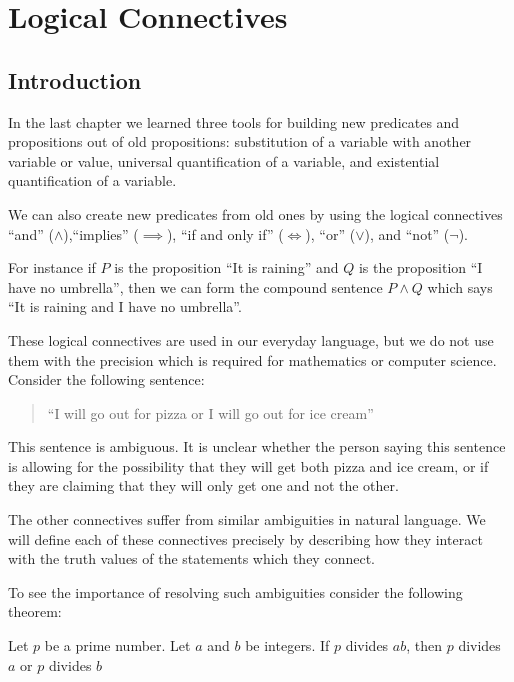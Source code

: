 \chapter{Logical Connectives}

\section{Introduction}

In the last chapter we learned three tools for building new predicates and propositions out of old propositions:  substitution of a variable with another variable or value, universal quantification of a variable, and existential quantification of a variable.

We can also create new predicates from old ones by using the logical connectives ``and'' ($\wedge$),``implies'' ($\implies$), ``if and only if'' ($\iff$), ``or'' ($\vee$), and ``not'' ($\neg$).

For instance if $P$ is the proposition ``It is raining'' and $Q$ is the proposition ``I have no umbrella'', then we can form the compound sentence $P \wedge Q$ which says ``It is raining and I have no umbrella''.

These logical connectives are used in our everyday language, but we do not use them with the precision which is required for mathematics or computer science.  Consider the following sentence:

\begin{quote}
		``I will go out for pizza or I will go out for ice cream''
\end{quote}

This sentence is ambiguous.  It is unclear whether the person saying this sentence is allowing for the possibility that they will get both pizza and ice cream, or if they are claiming that they will only get one and not the other.

The other connectives suffer from similar ambiguities in natural language.  We will define each of these connectives precisely by describing how they interact with the truth values of the statements which they connect.

To see the importance of resolving such ambiguities consider the following theorem:

\begin{theorem}
		Let $p$ be a prime number.  Let $a$ and $b$ be integers. If $p$ divides $ab$, then $p$ divides $a$ or $p$ divides $b$
\end{theorem}

